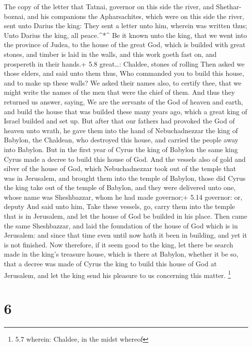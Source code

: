  The copy of the letter that Tatnai, governor on this side
the river, and Shethar-boznai, and his companions the Apharsachites,
which were on this side the river, sent unto Darius the king:
 They sent a letter unto him, wherein was written thus; Unto
Darius the king, all peace.\^{}*\^{}  Be it known unto the
king, that we went into the province of Judea, to the house of the great
God, which is builded with great stones, and timber is laid in the
walls, and this work goeth fast on, and prospereth in their hands.+ 5.8
great\ldots: Chaldee, stones of rolling  Then asked we those
elders, and said unto them thus, Who commanded you to build this house,
and to make up these walls?  We asked their names also, to
certify thee, that we might write the names of the men that were the
chief of them.  And thus they returned us answer, saying,
We are the servants of the God of heaven and earth, and build the house
that was builded these many years ago, which a great king of Israel
builded and set up.  But after that our fathers had
provoked the God of heaven unto wrath, he gave them into the hand of
Nebuchadnezzar the king of Babylon, the Chaldean, who destroyed this
house, and carried the people away into Babylon.  But in
the first year of Cyrus the king of Babylon the same king Cyrus made a
decree to build this house of God.  And the vessels also of
gold and silver of the house of God, which Nebuchadnezzar took out of
the temple that was in Jerusalem, and brought them into the temple of
Babylon, those did Cyrus the king take out of the temple of Babylon, and
they were delivered unto one, whose name was Sheshbazzar, whom he had
made governor;+ 5.14 governor: or, deputy  And said unto
him, Take these vessels, go, carry them into the temple that is in
Jerusalem, and let the house of God be builded in his place.
 Then came the same Sheshbazzar, and laid the foundation of
the house of God which is in Jerusalem: and since that time even until
now hath it been in building, and yet it is not finished. 
Now therefore, if it seem good to the king, let there be search made in
the king's treasure house, which is there at Babylon, whether it be so,
that a decree was made of Cyrus the king to build this house of God at
Jerusalem, and let the king send his pleasure to us concerning this
matter. \footnote{5.7 wherein: Chaldee, in the midst whereof}

\hypertarget{section-5}{%
\section{6}\label{section-5}}

